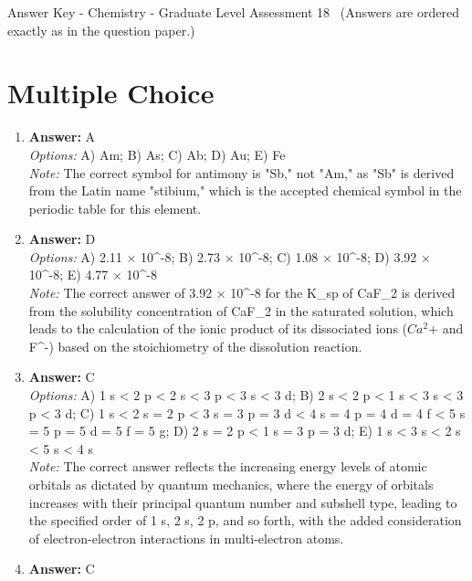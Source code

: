 \documentclass[12pt]{article}
\begin{document}
\begin{center}
Answer Key - Chemistry - Graduate Level Assessment 18 \
\small (Answers are ordered exactly as in the question paper.)
\end{center}

\section*{Multiple Choice}
\begin{enumerate}[label=\arabic*.]
\item \textbf{Answer:} A
\\ \textit{Options:} A) Am; B) As; C) Ab; D) Au; E) Fe
\\ \textit{Note:} The correct symbol for antimony is "Sb," not "Am," as "Sb" is derived from the Latin name "stibium," which is the accepted chemical symbol in the periodic table for this element.
\item \textbf{Answer:} D
\\ \textit{Options:} A) 2.11 \ensuremath{\times} 10^-8; B) 2.73 \ensuremath{\times} 10^-8; C) 1.08 \ensuremath{\times} 10^-8; D) 3.92 \ensuremath{\times} 10^-8; E) 4.77 \ensuremath{\times} 10^-8
\\ \textit{Note:} The correct answer of 3.92 × 10^-8 for the K\_sp of CaF\_2 is derived from the solubility concentration of CaF\_2 in the saturated solution, which leads to the calculation of the ionic product of its dissociated ions ($Ca^2$+ and F^-) based on the stoichiometry of the dissolution reaction.
\item \textbf{Answer:} C
\\ \textit{Options:} A) 1 s \textless{} 2 p \textless{} 2 s \textless{} 3 p \textless{} 3 s \textless{} 3 d; B) 2 s \textless{} 2 p \textless{} 1 s \textless{} 3 s \textless{} 3 p \textless{} 3 d; C) 1 s \textless{} 2 s = 2 p \textless{} 3 s = 3 p = 3 d \textless{} 4 s = 4 p = 4 d = 4 f \textless{} 5 s = 5 p = 5 d = 5 f = 5 g; D) 2 s = 2 p \textless{} 1 s = 3 p = 3 d; E) 1 s \textless{} 3 s \textless{} 2 s \textless{} 5 s \textless{} 4 s
\\ \textit{Note:} The correct answer reflects the increasing energy levels of atomic orbitals as dictated by quantum mechanics, where the energy of orbitals increases with their principal quantum number and subshell type, leading to the specified order of 1 s, 2 s, 2 p, and so forth, with the added consideration of electron-electron interactions in multi-electron atoms.
\item \textbf{Answer:} C

\end{enumerate}
\end{document}
